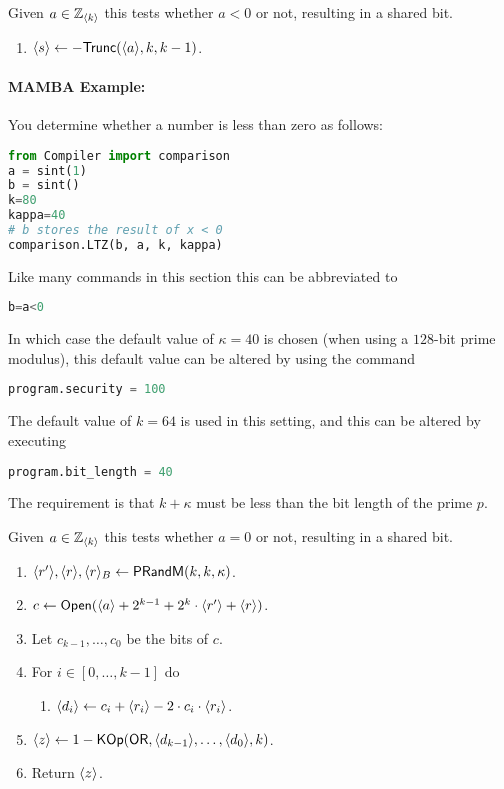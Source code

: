 Given $a \in {\mathbb{Z}}_{\langle k \rangle}$ this tests whether $a<0$ or not,
resulting in a shared bit.
\begin{enumerate}
\item $\langle s \rangle \leftarrow - \mathsf{Trunc}(\langle a \rangle,k,k-1)$.
\end{enumerate}

\paragraph{MAMBA Example:} You determine whether a number is less than zero as follows: 
\begin{lstlisting}[language={python}]
from Compiler import comparison
a = sint(1)
b = sint()
k=80
kappa=40
# b stores the result of x < 0
comparison.LTZ(b, a, k, kappa)
\end{lstlisting}
Like many commands in this section this can be abbreviated to
\begin{lstlisting}[language={python}]
b=a<0
\end{lstlisting}
In which case the default value of $\kappa=40$ is chosen
(when using a $128$-bit prime modulus), this default value can be 
altered by using the command
\begin{lstlisting}[language={python}]
program.security = 100
\end{lstlisting}
The default value of $k=64$ is used in this setting, and
this can be altered by executing
\begin{lstlisting}[language={python}]
program.bit_length = 40
\end{lstlisting}
The requirement is that $k+\kappa$ must be less than the bit length
of the prime $p$.


Given $a \in {\mathbb{Z}}_{\langle k \rangle}$ this tests whether $a=0$ or not,
resulting in a shared bit.
\begin{enumerate}
\item $\langle r' \rangle, \langle r \rangle, \langle r \rangle_B \leftarrow \mathsf{PRandM}(k,k,\kappa)$.
\item $c \leftarrow {\mathsf{Open}}(\langle a \rangle+2^{k-1}+2^k \cdot \langle r' \rangle+\langle r \rangle)$.
\item Let $c_{k-1},\ldots,c_0$ be the bits of $c$.
\item For $i \in [0,\ldots,k-1]$ do
\begin{enumerate}
   \item $\langle d_i \rangle \leftarrow c_i+\langle r_i \rangle-2 \cdot c_i \cdot \langle r_i \rangle$.
\end{enumerate}
\item $\langle z \rangle \leftarrow 1- \mathsf{KOp}(\mathsf{OR},\langle d_{k-1} \rangle,\ldots,\langle d_0 \rangle,k)$.
\item Return $\langle z \rangle$.
\end{enumerate}

